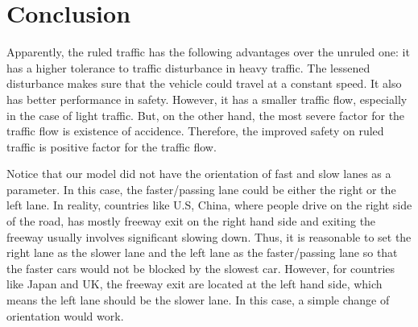 \documentclass[aps,prl,superscriptaddress,12pt]{revtex4-1}
\begin{document}
	\section{Conclusion}

	Apparently, the ruled traffic has the following advantages over the unruled one: it has a higher tolerance to traffic disturbance in heavy traffic. The lessened disturbance makes sure that the vehicle could travel at a constant speed. It also has better performance in safety. However, it has a smaller traffic flow, especially in the case of light traffic. But, on the other hand, the most severe factor for the traffic flow is existence of accidence. Therefore, the improved safety on ruled traffic is positive factor for the traffic flow. 

	Notice that our model did not have the orientation of fast and slow lanes as a parameter. In this case, the faster/passing lane could be either the right or the left lane. In reality, countries like U.S, China, where people drive on the right side of the road, has mostly freeway exit on the right hand side and exiting the freeway usually involves significant slowing down. Thus, it is reasonable to set the right lane as the slower lane and the left lane as the faster/passing lane so that the faster cars would not be blocked by the slowest car.  However, for countries like Japan and UK, the freeway exit are located at the left hand side, which means the left lane should be the slower lane. In this case, a simple change of orientation would work. 
	
	
	


\end{document}
